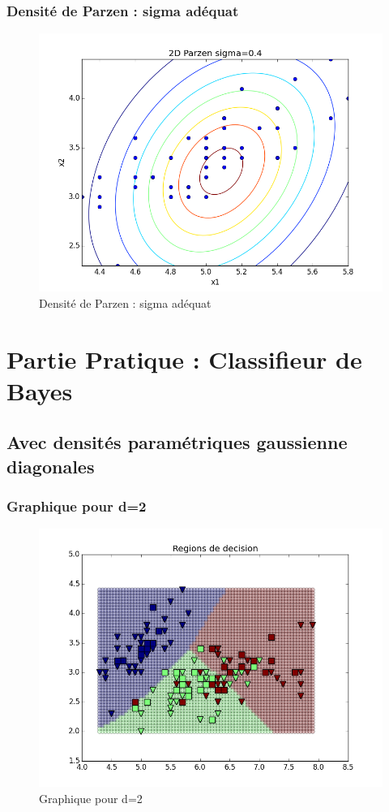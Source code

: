 \documentclass[a4paper,10pt]{article}
\begin{document}
\subsubsection{Densité de Parzen : sigma adéquat}
\begin{figure}[H]
	\includegraphics[width=12cm]{images/2D_Parzen_sigma_ad.png} 
	\centering
	\caption{Densité de Parzen : sigma adéquat}
	\label{fig:comp}
\end{figure}

\section{Partie Pratique : Classifieur de Bayes}

\subsection{Avec densités paramétriques gaussienne diagonales}

\subsubsection{Graphique pour d=2}
\begin{figure}[H]
	\includegraphics[width=12cm]{images/bayes_gaussienne.png} 
	\centering
	\caption{Graphique pour d=2}
	\label{fig:comp}
\end{figure}
\end{document}
